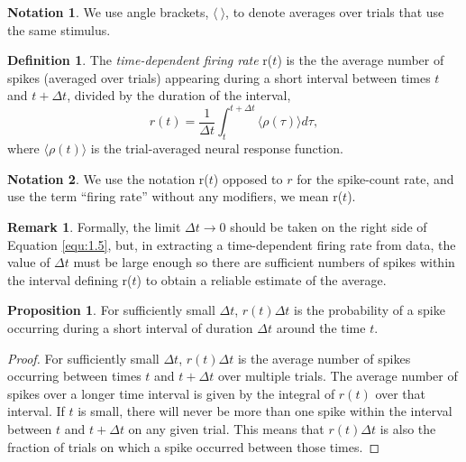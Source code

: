 \documentclass[letterpaper,oneside]{book}
\numberwithin{equation}{chapter}
\theoremstyle{definition}
\newtheorem{defn}[thm]{Definition}
\newtheorem{exm}[thm]{Example}
\newtheorem{ntn}{Notation}
\newtheorem{prop}[thm]{Proposition}
\newtheorem{rem}{Remark}[chapter]
\begin{document}
\begin{multicols}{2}
\begin{ntn}
  We use angle brackets, $\langle\ \rangle $, to denote averages over trials that use the same stimulus.
\end{ntn}


\begin{defn}
  The \emph{time-dependent firing rate} r($t$) is the the average number of spikes (averaged over trials) appearing 
  during a
  short interval between times $t$ and $t+\Delta t$, divided by the duration of
   the interval,
   \begin{equation}
    \label{equ:1.5}
     r(t)=\frac{1}{\Delta t}\int_t^{t+\Delta t}\langle \rho(\tau)\rangle d\tau,
   \end{equation}
   where $\langle\rho(t)\rangle$ is the trial-averaged neural response function.
\end{defn}      

\begin{ntn}
  We use the notation r($t$) opposed to $r$ for the spike-count rate, and use the term 
  “firing rate” without any
modifiers, we mean r($t$).
\end{ntn}

\begin{rem}
  Formally, the limit $\Delta t\rightarrow 0$ should be taken on
the right side of Equation \ref{equ:1.5}, but, in extracting a time-dependent firing
rate from data, the value of $\Delta t$ must be large enough so there are sufficient
numbers of spikes within the interval defining r($t$) to obtain a reliable estimate of the 
average.
\end{rem}

\begin{prop}
  For sufficiently small $\Delta t$, $r(t)\Delta t$ 
  is the probability of a spike occurring during a short interval of duration $\Delta t$ around the time $t$.
  \begin{proof}
  For sufficiently small $\Delta t$, $r(t)\Delta t$ is the average number of spikes occurring
between times $t$ and $t + \Delta t$ over multiple trials. The average number of
spikes over a longer time interval is given by the integral of $r ( t )$ over that
interval. If $t$ is small, there will never be more than one spike within the
interval between $t$ and $t + \Delta t$ on any given trial. This means that $r(t)\Delta t$ is
also the fraction of trials on which a spike occurred between those times.
\end{proof}
\end{prop}




\end{multicols}
\end{document}
